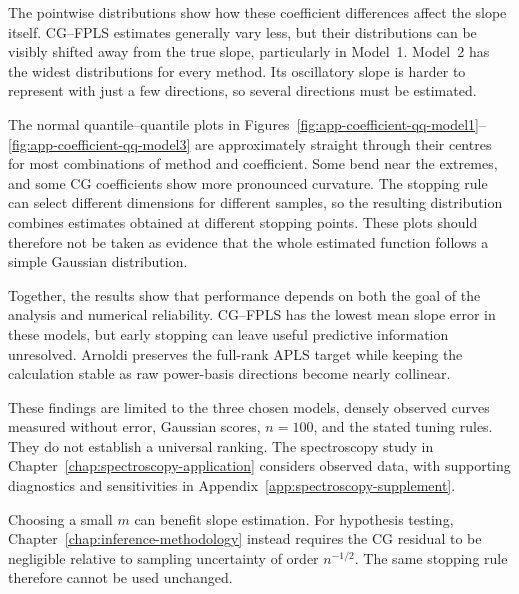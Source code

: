 The pointwise distributions show how these coefficient differences affect
the slope itself.  CG--FPLS estimates generally vary less, but their
distributions can be visibly shifted away from the true slope,
particularly in Model~1.  Model~2 has the widest distributions for every
method.  Its oscillatory slope is harder to represent with just a few
directions, so several directions must be estimated.

The normal quantile--quantile plots in
Figures~\ref{fig:app-coefficient-qq-model1}--
\ref{fig:app-coefficient-qq-model3} are approximately straight through
their centres for most combinations of method and coefficient.  Some bend
near the extremes, and some CG coefficients show more pronounced curvature.
The stopping rule can select different dimensions for different samples,
so the resulting distribution combines estimates obtained at different
stopping points.  These plots should therefore not be taken as evidence
that the whole estimated function follows a simple Gaussian distribution.

Together, the results show that performance depends on both the goal of the
analysis and numerical reliability. CG--FPLS has the lowest mean slope error
in these models, but early stopping can leave useful predictive information
unresolved. Arnoldi preserves the full-rank APLS target while keeping the
calculation stable as raw power-basis directions become nearly collinear.

These findings are limited to the three chosen models, densely observed
curves measured without error, Gaussian scores, $n=100$, and the stated tuning
rules. They do not establish a universal ranking. The spectroscopy study in
Chapter~\ref{chap:spectroscopy-application} considers observed data, with
supporting diagnostics and sensitivities in
Appendix~\ref{app:spectroscopy-supplement}.

Choosing a small $m$ can benefit slope estimation. For hypothesis testing,
Chapter~\ref{chap:inference-methodology} instead requires the CG residual
to be negligible relative to sampling uncertainty of order $n^{-1/2}$.
The same stopping rule therefore cannot be used unchanged.
